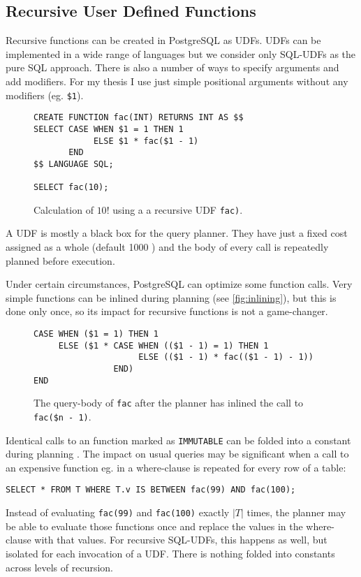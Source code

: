 \subsection{Recursive User Defined Functions}
Recursive functions can be created in PostgreSQL as UDFs. UDFs can be implemented in a wide range of languages but we consider only SQL-UDFs as the pure SQL approach. There is also a number of ways to specify arguments and add modifiers. For my thesis I use just simple positional arguments without any modifiers (eg. \texttt{\$1}).

\begin{figure}[h!]
    \centering
    \begin{verbatim}
CREATE FUNCTION fac(INT) RETURNS INT AS $$
SELECT CASE WHEN $1 = 1 THEN 1
            ELSE $1 * fac($1 - 1)
       END
$$ LANGUAGE SQL;

SELECT fac(10);
    \end{verbatim}
    \caption{Calculation of $10!$ using a a recursive UDF \texttt{fac)}.}
    \label{fig:my_label}
\end{figure}

A UDF is mostly a black box for the query planner. They have just a fixed cost assigned as a whole (default 1000 \cite[p. 1435]{psql}) and the body of every call is repeatedly planned before execution.

Under certain circumstances, PostgreSQL can optimize some function calls. Very simple functions can be inlined during planning \cite{psqlWikiUDFinlining}  (see \autoref{fig:inlining}), but this is done only once, so its impact for recursive functions is not a game-changer.


\begin{figure}[h!]
    \centering
    \begin{verbatim}
CASE WHEN ($1 = 1) THEN 1
     ELSE ($1 * CASE WHEN (($1 - 1) = 1) THEN 1
                     ELSE (($1 - 1) * fac(($1 - 1) - 1))
                END)
END
    \end{verbatim}
    \caption{The query-body of \texttt{fac} after the planner has inlined the call to \texttt{fac(\$n - 1)}.}
    \label{fig:inlining}
\end{figure}

Identical calls to an function marked as \texttt{IMMUTABLE} can be folded into a constant during planning \cite[p. 995]{psql}. The impact on usual queries may be significant when a call to an expensive function eg. in a where-clause is repeated for every row of a table:\\
\begin{verbatim}
SELECT * FROM T WHERE T.v IS BETWEEN fac(99) AND fac(100);
\end{verbatim}
Instead of evaluating \texttt{fac(99)} and \texttt{fac(100)} exactly $|T|$ times, the planner may be able to evaluate those functions once and replace the values in the where-clause with that values. For recursive SQL-UDFs, this happens as well, but isolated for each invocation of a UDF. There is nothing folded into constants across levels of recursion.

